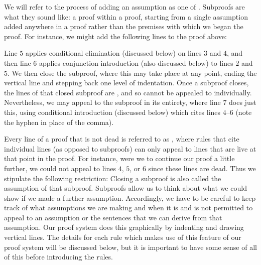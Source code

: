 We will refer to the process of adding an assumption as one of .
Subproofs are what they sound like: a proof within a proof, starting from a single assumption added anywhere in a proof rather than the premises with which we began the proof.
For instance, we might add the following lines to the proof above:
\begin{fitchproof}
   \pr{}
   \pr{}
   
  \open
     \as{}
     
     
  \close
   
\end{fitchproof}
Line $5$ applies conditional elimination (discussed below) on lines $3$ and $4$, and then line $6$ applies conjunction introduction (also discussed below) to lines $2$ and $5$.
We then close the subproof, where this may take place at any point, ending the vertical line and stepping back one level of indentation.
Once a subproof closes, the lines of that closed subproof are , and so cannot be appealed to individually.
Nevertheless, we may appeal to the subproof in its entirety, where line $7$ does just this, using conditional introduction (discussed below) which cites lines $4$--$6$ (note the hyphen in place of the comma).

Every line of a proof that is not dead is referred to as , where rules that cite individual lines (as opposed to subproofs) can only appeal to lines that are live at that point in the proof.
For instance, were we to continue our proof a little further, we could not appeal to lines $4$, $5$, or $6$ since these lines are dead.
Thus we stipulate the following restriction:
Closing a subproof is also called  the assumption of that subproof.
Subproofs allow us to think about what we could show if we made a further assumption.
Accordingly, we have to be careful to keep track of what assumptions we are making and when it is and is not permitted to appeal to an assumption or the sentences that we can derive from that assumption.
Our proof system does this graphically by indenting and drawing vertical lines.
The details for each rule which makes use of this feature of our proof system will be discussed below, but it is important to have some sense of all of this before introducing the rules.






